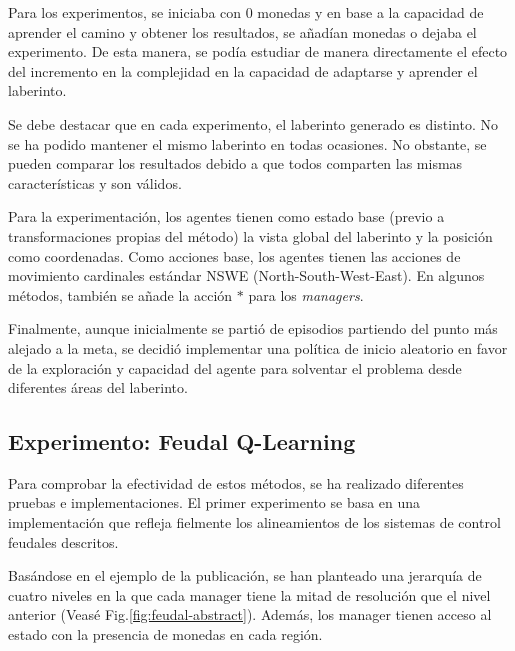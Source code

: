 \documentclass[letterpaper]{article} %
\begin{document}
Para los experimentos, se iniciaba con 0 monedas y en base a la capacidad de aprender el camino y obtener los resultados, se añadían monedas o dejaba el experimento.
De esta manera, se podía estudiar de manera directamente el efecto del incremento en la complejidad en la capacidad de adaptarse y aprender el laberinto. 

Se debe destacar que en cada experimento, el laberinto generado es distinto. No se ha podido mantener el mismo laberinto en todas ocasiones. No obstante,
se pueden comparar los resultados debido a que todos comparten las mismas características y son válidos.

Para la experimentación, los agentes tienen como estado base (previo a transformaciones propias del método) la vista global del laberinto y la posición como coordenadas. 
Como acciones base, los agentes tienen las acciones de movimiento cardinales estándar NSWE (North-South-West-East). En algunos métodos, 
también se añade la acción $*$ para los \textit{managers}.

Finalmente, aunque inicialmente se partió de episodios partiendo del punto más alejado a la meta, se decidió implementar una política de inicio aleatorio en favor de la exploración y capacidad del agente para solventar el problema desde diferentes áreas del laberinto.

\subsection{Experimento: Feudal Q-Learning}
Para comprobar la efectividad de estos métodos, se ha realizado diferentes pruebas e implementaciones. El primer experimento
se basa en una implementación que refleja fielmente los alineamientos de los sistemas de control feudales descritos. 

Basándose en el ejemplo de la publicación, se han planteado una jerarquía de cuatro niveles en la que cada manager tiene la mitad de resolución 
que el nivel anterior (Veasé Fig.\ref{fig:feudal-abstract}). Además, los manager tienen acceso al estado con la presencia de monedas en cada región.  
\end{document}
